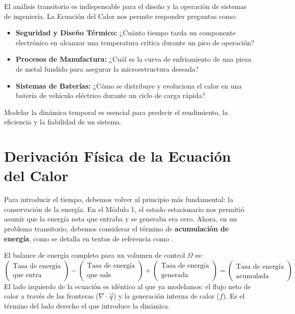 \documentclass[11pt, a4paper]{article}
\begin{document}
\begin{infobox}
    El análisis transitorio es indispensable para el diseño y la operación de sistemas de ingeniería. La Ecuación del Calor nos permite responder preguntas como:
    \begin{itemize}
        \item \textbf{Seguridad y Diseño Térmico:} ¿Cuánto tiempo tarda un componente electrónico en alcanzar una temperatura crítica durante un pico de operación?
        \item \textbf{Procesos de Manufactura:} ¿Cuál es la curva de enfriamiento de una pieza de metal fundido para asegurar la microestructura deseada?
        \item \textbf{Sistemas de Baterías:} ¿Cómo se distribuye y evoluciona el calor en una batería de vehículo eléctrico durante un ciclo de carga rápida?
    \end{itemize}
    Modelar la dinámica temporal es esencial para predecir el rendimiento, la eficiencia y la fiabilidad de un sistema.
\end{infobox}

\section{Derivación Física de la Ecuación del Calor}
Para introducir el tiempo, debemos volver al principio más fundamental: la conservación de la energía. En el Módulo 1, el estado estacionario nos permitió asumir que la energía neta que entraba y se generaba era cero. Ahora, en un problema transitorio, debemos considerar el término de \textbf{acumulación de energía}, como se detalla en textos de referencia como \cite{incropera2007}.

El balance de energía completo para un volumen de control $\Omega$ es:
$$ \left( \begin{array}{c} \text{Tasa de energía} \\ \text{que entra} \end{array} \right) - \left( \begin{array}{c} \text{Tasa de energía} \\ \text{que sale} \end{array} \right) + \left( \begin{array}{c} \text{Tasa de energía} \\ \text{generada} \end{array} \right) = \left( \begin{array}{c} \text{Tasa de energía} \\ \text{acumulada} \end{array} \right) $$
El lado izquierdo de la ecuación es idéntico al que ya modelamos: el flujo neto de calor a través de las fronteras ($\nabla \cdot \vec{q}$) y la generación interna de calor ($f$). Es el término del lado derecho el que introduce la dinámica.
\end{document}
